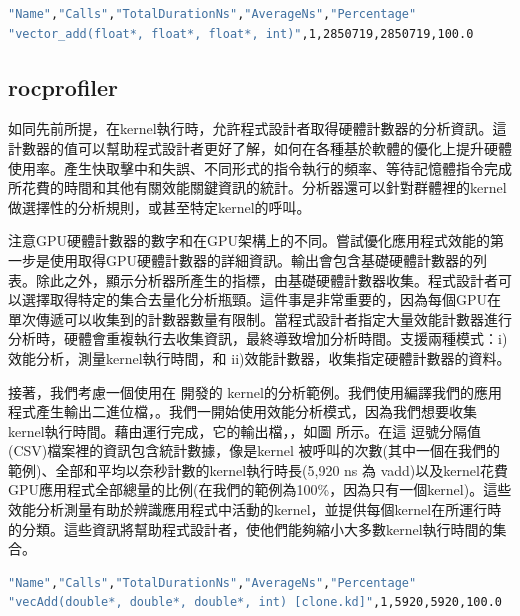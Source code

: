 \begin{lstlisting}[language=bash, caption={應用程式追蹤模式下\term{results.stats.csv}的輸出}, label={lst:results.stats.csv output}]
"Name","Calls","TotalDurationNs","AverageNs","Percentage"
"vector_add(float*, float*, float*, int)",1,2850719,2850719,100.0
\end{lstlisting}

\subsection{rocprofiler}

如同先前所提，在kernel執行時，允許程式設計者取得硬體計數器的分析資訊。這計數器的值可以幫助程式設計者更好了解，如何在各種基於軟體的優化上提升硬體使用率。產生快取擊中和失誤、不同形式的指令執行的頻率、等待記憶體指令完成所花費的時間和其他有關效能關鍵資訊的統計。分析器還可以針對群體裡的kernel做選擇性的分析規則，或甚至特定kernel的呼叫。

注意GPU硬體計數器的數字和在GPU架構上的不同。嘗試優化應用程式效能的第一步是使用取得GPU硬體計數器的詳細資訊。輸出會包含基礎硬體計數器的列表。除此之外，顯示分析器所產生的指標，由基礎硬體計數器收集。程式設計者可以選擇取得特定的集合去量化分析瓶頸。這件事是非常重要的，因為每個GPU在單次傳遞可以收集到的計數器數量有限制。當程式設計者指定大量效能計數器進行分析時，硬體會重複執行去收集資訊，最終導致增加分析時間。支援兩種模式：i)效能分析，測量kernel執行時間，和 ii)效能計數器，收集指定硬體計數器的資料。

接著，我們考慮一個使用在 開發的 kernel的分析範例。我們使用編譯我們的應用程式產生輸出二進位檔，。我們一開始使用效能分析模式，因為我們想要收集kernel執行時間。藉由運行完成，它的輸出檔，，如圖 所示。在這
逗號分隔值(CSV)檔案裡的資訊包含統計數據，像是kernel 被呼叫的次數(其中一個在我們的範例)、全部和平均以奈秒計數的kernel執行時長(5,920 ns 為 vadd)以及kernel花費GPU應用程式全部總量的比例(在我們的範例為100\%，因為只有一個kernel)。這些效能分析測量有助於辨識應用程式中活動的kernel，並提供每個kernel在所運行時的分類。這些資訊將幫助程式設計者，使他們能夠縮小大多數kernel執行時間的集合。

\begin{lstlisting}[language=bash, caption={效能測量模式中\term{rocProf}的輸出}, label={lst:rocProf output}]
"Name","Calls","TotalDurationNs","AverageNs","Percentage"
"vecAdd(double*, double*, double*, int) [clone.kd]",1,5920,5920,100.0
\end{lstlisting}

